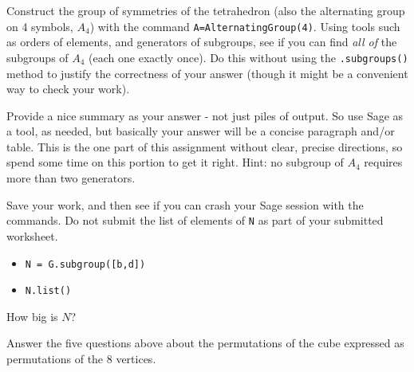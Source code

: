 \begin{sageverbatim}\end{sageverbatim}
%
Construct the group of symmetries of the tetrahedron (also the alternating group on 4 symbols, $A_4$) with the command \verb?A=AlternatingGroup(4)?.  Using tools such as orders of elements, and generators of subgroups, see if you can find \emph{all of} the subgroups of $A_4$ (each one exactly once).  Do this without using the \verb?.subgroups()? method to justify the correctness of your answer (though it might be a convenient way to check your work).\par
%
Provide a nice summary as your answer - not just piles of output.  So use Sage as a tool, as needed, but basically your answer will be a concise paragraph and/or table.  This is the one part of this assignment without clear, precise directions, so spend some time on this portion to get it right.  Hint: no subgroup of $A_4$ requires more than two generators.
\begin{sageverbatim}\end{sageverbatim}
%
Save your work, and then see if you can crash your Sage session with the commands.  Do not submit the list of elements of \verb?N? as part of your submitted worksheet.
%
\begin{itemize}
\item\verb?N = G.subgroup([b,d])?
\item\verb?N.list()?
\end{itemize}
%
How big is $N$?
\begin{sageverbatim}\end{sageverbatim}
%
Answer the five questions above about the permutations of the cube expressed as permutations of the 8 vertices.
\begin{sageverbatim}\end{sageverbatim}
%
